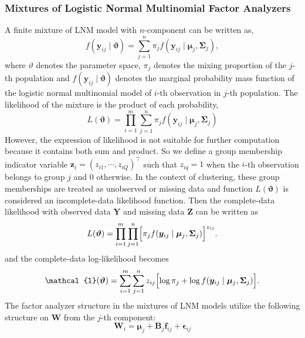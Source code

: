 \documentclass[]{report}
\theoremstyle{definition}
\begin{document}
\subsubsection{Mixtures of Logistic Normal Multinomial Factor Analyzers}
A finite mixture of LNM model with $n$-component can be written as,
\begin{equation}
f(\boldsymbol{y}_{ij}\mid \boldsymbol{\vartheta})=\sum_{j=1}^{n}\pi_{j}f(\boldsymbol{y}_{ij}\mid\boldsymbol{\mu}_{j},\boldsymbol{\Sigma}_{j}),
\end{equation}
where $\vartheta$ denotes the parameter space, $\pi_{j}$ denotes the mixing proportion of  the $j$-th population and $f(\boldsymbol{y}_{ij}\mid \boldsymbol{\vartheta})$ denotes the marginal probability mass function of the logistic normal multinomial model of $i$-th observation in $j$-th population. The likelihood of the mixture is the product of each probability,
\begin{equation}
L(\boldsymbol{\vartheta})=\prod_{i=1}^{m}\sum_{j=1}^{n}\pi_{j}f(\boldsymbol{y}_{ij}\mid\boldsymbol{\mu}_{j},\boldsymbol{\Sigma}_{j})
\end{equation}
However, the expression of likelihood is not suitable for further computation because it contains both sum and product. So we define a group membership indicator variable $\boldsymbol{z}_{i}=(z_{i1},\cdots ,z_{iQ})^{\top}$ such that $z_{iq}=1$ when the $i$-th observation belongs to group $j$ and 0 otherwise. In the context of clustering, these group memberships are treated as unobserved or missing data and function $L(\boldsymbol{\vartheta})$ is considered an incomplete-data likelihood function. Then the complete-data likelihood with observed data $\boldsymbol{Y}$ and missing data $\boldsymbol{Z}$ can be written as
\begin{equation}
L(\boldsymbol{\vartheta})=\prod_{i=1}^{m}\prod_{j=1}^{n}\Bigl[\pi_{j}f(\boldsymbol{y}_{ij}\mid\boldsymbol{\mu}_{j},\boldsymbol{\Sigma}_{j})\Bigr]^{z_{ij}}.
\end{equation}
and the complete-data log-likelihood becomes
\begin{equation}
\mathcal{l}(\boldsymbol{\vartheta})=\sum_{i=1}^{m}\sum_{j=1}^{n}z_{ij}\Bigl[\log \pi_{j}+\log f(\boldsymbol{y}_{ij}\mid\boldsymbol{\mu}_{j},\boldsymbol{\Sigma}_{j})\Bigr].
\end{equation}
The factor analyzer structure in the mixtures of LNM models utilize the following structure on $\boldsymbol{W}$ from the $j$-th component:
\begin{equation}
\boldsymbol{W}_{i}=\boldsymbol{\mu}_{j}+\boldsymbol{\mathbf{B}}_{j}\mathbf{f}_{ij}+\boldsymbol{\epsilon}_{ij}
\end{equation}
\newpage

	
\end{document}
